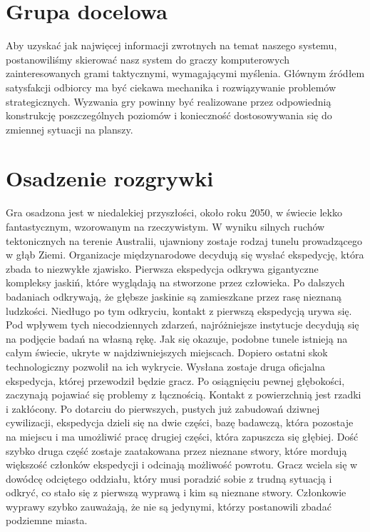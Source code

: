 \documentclass[licencjacka]{pracamgr}
\begin{document}
  \section{Grupa docelowa}
  Aby uzyskać jak najwięcej informacji zwrotnych na temat naszego systemu, postanowiliśmy skierować nasz system do
  graczy komputerowych zainteresowanych grami taktycznymi, wymagającymi myślenia. Głównym źródłem satysfakcji
  odbiorcy ma być ciekawa mechanika i rozwiązywanie problemów strategicznych. Wyzwania gry powinny być realizowane przez
  odpowiednią konstrukcję poszczególnych poziomów i konieczność dostosowywania się do zmiennej sytuacji na planszy.

  \section{Osadzenie rozgrywki}
  Gra osadzona jest w niedalekiej przyszłości, około roku 2050, w świecie lekko fantastycznym, wzorowanym na
  rzeczywistym. W wyniku silnych ruchów tektonicznych na terenie Australii, ujawniony zostaje rodzaj tunelu
  prowadzącego w głąb Ziemi. Organizacje międzynarodowe decydują się wysłać ekspedycję, która zbada to niezwykłe
  zjawisko. Pierwsza ekspedycja odkrywa gigantyczne kompleksy jaskiń, które wyglądają na stworzone przez człowieka.
  Po dalszych badaniach odkrywają, że głębsze jaskinie są zamieszkane przez rasę nieznaną ludzkości. Niedługo
  po tym odkryciu, kontakt z pierwszą ekspedycją urywa się. Pod wpływem tych niecodziennych zdarzeń, najróżniejsze
  instytucje decydują się na podjęcie badań na własną rękę. Jak się okazuje, podobne tunele istnieją na całym świecie,
  ukryte w najdziwniejszych miejscach. Dopiero ostatni skok technologiczny pozwolił na ich wykrycie. Wysłana zostaje
  druga oficjalna ekspedycja, której przewodził będzie gracz. Po osiągnięciu pewnej głębokości, zaczynają pojawiać się
  problemy z łącznością. Kontakt z powierzchnią jest rzadki i zakłócony. Po dotarciu do pierwszych, pustych już zabudowań
  dziwnej cywilizacji, ekspedycja dzieli się na dwie części, bazę badawczą, która pozostaje na miejscu i ma umożliwić
  pracę drugiej części, która zapuszcza się głębiej. Dość szybko druga część zostaje zaatakowana przez nieznane stwory,
  które mordują większość członków ekspedycji i odcinają możliwość powrotu. Gracz wciela się w dowódcę odciętego
  oddziału, który musi poradzić sobie z trudną sytuacją i odkryć, co stało się z pierwszą wyprawą i kim są nieznane
  stwory. Członkowie wyprawy szybko zauważają, że nie są jedynymi, którzy postanowili zbadać podziemne miasta.
\end{document}
